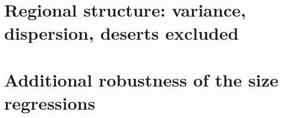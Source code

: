 \documentclass[11pt]{article}
\begin{document}
\clearpage

\section{Regional structure: variance, dispersion, deserts excluded}\label{si:regional}







\clearpage

\section{Additional robustness of the size regressions}\label{si:scaling-extra}
\end{document}
